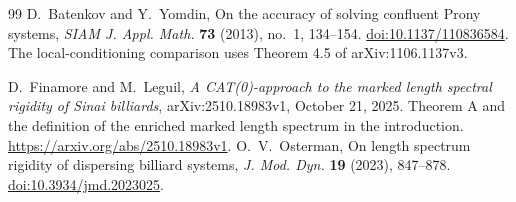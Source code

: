 \begin{thebibliography}{99}
D.~Batenkov and Y.~Yomdin, On the accuracy of solving confluent Prony
systems, \emph{SIAM J. Appl. Math.} \textbf{73} (2013), no.~1,
134--154. \href{https://doi.org/10.1137/110836584}{doi:10.1137/110836584}.
The local-conditioning comparison uses Theorem 4.5 of
arXiv:1106.1137v3.

D.~Finamore and M.~Leguil, \emph{A CAT(0)-approach to the marked
length spectral rigidity of Sinai billiards}, arXiv:2510.18983v1,
October 21, 2025. Theorem A and the definition of the enriched
marked length spectrum in the introduction.
\url{https://arxiv.org/abs/2510.18983v1}.
O.~V.~Osterman, On length spectrum rigidity of dispersing billiard
systems, \emph{J. Mod. Dyn.} \textbf{19} (2023), 847--878.
\href{https://doi.org/10.3934/jmd.2023025}{doi:10.3934/jmd.2023025}.
\end{thebibliography}
